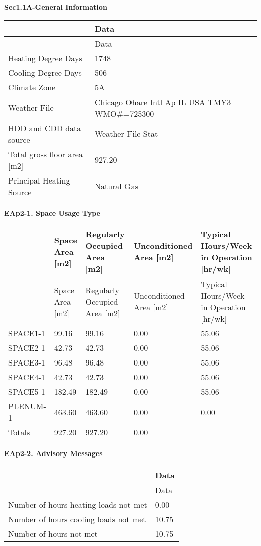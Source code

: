 \textbf{Sec1.1A-General Information}

\begin{longtable}[c]{>{\raggedright}p{2.21in}>{\raggedright}p{3.78in}}
\toprule 
 & Data \tabularnewline
\midrule
\endfirsthead

\toprule 
 & Data \tabularnewline
\midrule
\endhead

Heating Degree Days & 1748 \tabularnewline
Cooling Degree Days & 506 \tabularnewline
Climate Zone & 5A \tabularnewline
Weather File & Chicago Ohare Intl Ap IL USA TMY3 WMO\#=725300 \tabularnewline
HDD and CDD data source & Weather File Stat \tabularnewline
Total gross floor area [m2] & 927.20 \tabularnewline
Principal Heating Source & Natural Gas \tabularnewline
\bottomrule
\end{longtable}

\textbf{EAp2-1. Space Usage Type}

\begin{longtable}[c]{>{\raggedright}p{1.2in}>{\raggedright}p{1.2in}>{\raggedright}p{1.2in}>{\raggedright}p{1.2in}>{\raggedright}p{1.2in}}
\toprule 
 & Space Area [m2] & Regularly Occupied Area [m2] & Unconditioned Area [m2] & Typical Hours/Week in Operation [hr/wk] \tabularnewline
\midrule
\endfirsthead

\toprule 
 & Space Area [m2] & Regularly Occupied Area [m2] & Unconditioned Area [m2] & Typical Hours/Week in Operation [hr/wk] \tabularnewline
\midrule
\endhead

SPACE1-1 & 99.16 & 99.16 & 0.00 & 55.06 \tabularnewline
SPACE2-1 & 42.73 & 42.73 & 0.00 & 55.06 \tabularnewline
SPACE3-1 & 96.48 & 96.48 & 0.00 & 55.06 \tabularnewline
SPACE4-1 & 42.73 & 42.73 & 0.00 & 55.06 \tabularnewline
SPACE5-1 & 182.49 & 182.49 & 0.00 & 55.06 \tabularnewline
PLENUM-1 & 463.60 & 463.60 & 0.00 & 0.00 \tabularnewline
Totals & 927.20 & 927.20 & 0.00 & ~ \tabularnewline
\bottomrule
\end{longtable}

\textbf{EAp2-2. Advisory Messages}

\begin{longtable}[c]{@{}ll@{}}
\toprule 
 & Data \tabularnewline
\midrule
\endfirsthead

\toprule 
 & Data \tabularnewline
\midrule
\endhead

Number of hours heating loads not met & 0.00 \tabularnewline
Number of hours cooling loads not met & 10.75 \tabularnewline
Number of hours not met & 10.75 \tabularnewline
\bottomrule
\end{longtable}

